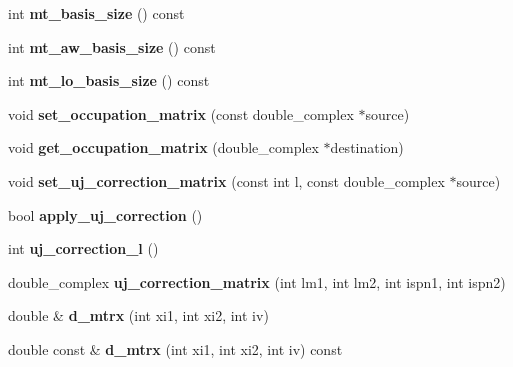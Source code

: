 \begin{DoxyCompactItemize}
\item 
\hypertarget{classsirius_1_1_atom_acbb0d2bc6c95b422146ba01b6f41592e}{}int {\bfseries mt\+\_\+basis\+\_\+size} () const \label{classsirius_1_1_atom_acbb0d2bc6c95b422146ba01b6f41592e}

\item 
\hypertarget{classsirius_1_1_atom_ad4567c2d6edd8daa98eca375fddcb12e}{}int {\bfseries mt\+\_\+aw\+\_\+basis\+\_\+size} () const \label{classsirius_1_1_atom_ad4567c2d6edd8daa98eca375fddcb12e}

\item 
\hypertarget{classsirius_1_1_atom_a48a22e875bfca6624bab9cb2881138ba}{}int {\bfseries mt\+\_\+lo\+\_\+basis\+\_\+size} () const \label{classsirius_1_1_atom_a48a22e875bfca6624bab9cb2881138ba}

\item 
\hypertarget{classsirius_1_1_atom_ab53fc241f070277dc796e21e977fefff}{}void {\bfseries set\+\_\+occupation\+\_\+matrix} (const double\+\_\+complex $\ast$source)\label{classsirius_1_1_atom_ab53fc241f070277dc796e21e977fefff}

\item 
\hypertarget{classsirius_1_1_atom_a4d43c8aa54d93beb6124b8fd767b6ab9}{}void {\bfseries get\+\_\+occupation\+\_\+matrix} (double\+\_\+complex $\ast$destination)\label{classsirius_1_1_atom_a4d43c8aa54d93beb6124b8fd767b6ab9}

\item 
\hypertarget{classsirius_1_1_atom_a38dfe35f995f5d9c68552a043163eb5f}{}void {\bfseries set\+\_\+uj\+\_\+correction\+\_\+matrix} (const int l, const double\+\_\+complex $\ast$source)\label{classsirius_1_1_atom_a38dfe35f995f5d9c68552a043163eb5f}

\item 
\hypertarget{classsirius_1_1_atom_a0d02cd69e524d7cd7a7060fb180c533a}{}bool {\bfseries apply\+\_\+uj\+\_\+correction} ()\label{classsirius_1_1_atom_a0d02cd69e524d7cd7a7060fb180c533a}

\item 
\hypertarget{classsirius_1_1_atom_a0233d921bbf4b081050b4d44e35ee559}{}int {\bfseries uj\+\_\+correction\+\_\+l} ()\label{classsirius_1_1_atom_a0233d921bbf4b081050b4d44e35ee559}

\item 
\hypertarget{classsirius_1_1_atom_a2a3c45fdb55bb1dcfad5cd7b6042029a}{}double\+\_\+complex {\bfseries uj\+\_\+correction\+\_\+matrix} (int lm1, int lm2, int ispn1, int ispn2)\label{classsirius_1_1_atom_a2a3c45fdb55bb1dcfad5cd7b6042029a}

\item 
\hypertarget{classsirius_1_1_atom_abe91c3fa8e81967966034db03cabfa89}{}double \& {\bfseries d\+\_\+mtrx} (int xi1, int xi2, int iv)\label{classsirius_1_1_atom_abe91c3fa8e81967966034db03cabfa89}

\item 
\hypertarget{classsirius_1_1_atom_a42a2dcf2394890915b90865174b57326}{}double const \& {\bfseries d\+\_\+mtrx} (int xi1, int xi2, int iv) const \label{classsirius_1_1_atom_a42a2dcf2394890915b90865174b57326}

\end{DoxyCompactItemize}
